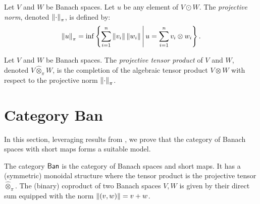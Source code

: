 \begin{definition}
  Let $V$ and $W$ be Banach spaces. Let $u$ be any element of $V \odot W$. The \emph{projective norm}, denoted $\left\lVert  \cdot  \right\rVert_{\pi}$,  is defined by: 
  \[
 \left\lVert u \right\rVert_{\pi} = \inf\left\{ \sum_{i=1}^n \left\lVert v_i \right\rVert \left\lVert w_i \right\rVert \Bigg| \, u = \sum_{i=1}^n v_i \otimes w_i\right\}.
\]
\end{definition}




\begin{definition}
  Let \( V \) and \( W \) be Banach spaces. The \emph{projective tensor product} of \( V \) and \( W \), denoted  $ V \widehat{\otimes}_\pi W$, is the completion of the algebraic tensor product \( V \otimes W \) with respect to the projective norm \( \left\lVert \cdot \right\rVert_{\pi} \).
\end{definition}







\section{Category Ban}

In this section, leveraging results from \cite{dahlqvist2023syntactic}, we prove that the category of Banach spaces with short maps forms a suitable model.

\begin{comment}
\begin{definition}
Let \( x = (x_1, x_2, \dots, x_n) \in \mathbb{C}^n \). The \( L^1 \) norm, \gls{l1_norm},  is defined by
\[
\|x\|_{L^1} = \sum_{i=1}^n |x_i|.
\]
\end{definition}
\end{comment}

\begin{definition}
  The category $\mathsf{Ban}$ is the category of Banach spaces and short maps. It has a (symmetric) monoidal structure  where the tensor product is the projective tensor $\widehat{\otimes}_\pi$.
  The (binary) coproduct of two Banach spaces $V,W$ is given by their direct sum equipped with the norm $\left\lVert (v,w) \right\rVert = v + w$.  
\end{definition}


